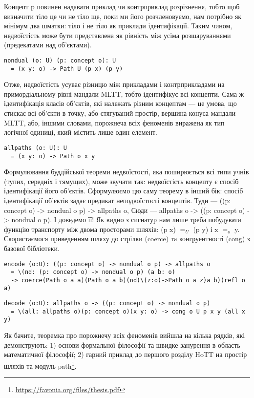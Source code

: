 Концепт p повинен надавати приклад чи контрприклад розрізнення,
тобто щоб визначити тіло це чи не тіло ще, поки ми його розчленовуємо,
нам потрібно як мінімум два шматки: тіло і не тіло як приклади ідентифікації.
Таким чином, недвоїстість може бути представлена як рівність між усіма
розшаруваннями (предекатами над об'єктами).

\begin{lstlisting}
nondual (o: U) (p: concept o): U
  = (x y: o) -> Path U (p x) (p y)
\end{lstlisting}

Отже, недвоїстість усуває різницю між прикладами і контрприкладами
на примордіальному рівні мандали MLTT, тобто ідентифікує всі концепти.
Сама ж ідентифікація класів об'єктів, які належать різним концептам ---
це умова, що стискає всі об'єкти в точку, або стягуваний простір, вершина
конуса мандали MLTT, або, іншими словами, порожнеча всіх феноменів виражена
як тип логічної одиниці, який містить лише один елемент.

\begin{lstlisting}
allpaths (o: U): U
  = (x y: o) -> Path o x y
\end{lstlisting}

Формулювання буддійської теореми недвоїстості, яка поширюється всі
типи учнів (тупих, середніх і тямущих), може звучати так: недвоїстість
концепту є спосіб ідентифікації його об'єктів. Сформулюємо цю саму теорему
в інший бік: спосіб ідентифікації об'єктів задає предикат неподвоїстості
концептів. Туди --- ((p: concept o) -> nondual o p) -> allpaths o,
Сюди --- allpaths o -> ((p: concept o) -> nondual o p). І доведемо її!
Як видно з сигнатур нам лише треба побудувати функцію транспорту між
двома просторами шляхів: (p x) $=_U$ (p y) і x $=_o$ y. Скористаємося
приведенням шляху до стрілки (coerce) та конгруентності (cong) з базової бібліотеки.

\begin{lstlisting}
encode (o:U): ((p: concept o) -> nondual o p) -> allpaths o
  = \(nd: (p: concept o) -> nondual o p) (a b: o)
  -> coerce(Path o a a)(Path o a b)(nd(\(z:o)->Path o a z)a b)(refl o a)
\end{lstlisting}

\begin{lstlisting}
decode (o:U): allpaths o -> ((p: concept o) -> nondual o p)
  = \(all: allpaths o)(p: concept o)(x y: o) -> cong o U p x y (all x y)
\end{lstlisting}

Як бачите, теоремка про порожнечу всіх феноменів вийшла на кілька рядків,
які демонструють: 1) основи формальної філософії та швидке занурення в область
математичної філософії; 2) гарний приклад до першого розділу HoTT на простір
шляхів та модуль path\footnote{\url{https://favonia.org/files/thesis.pdf}}.

